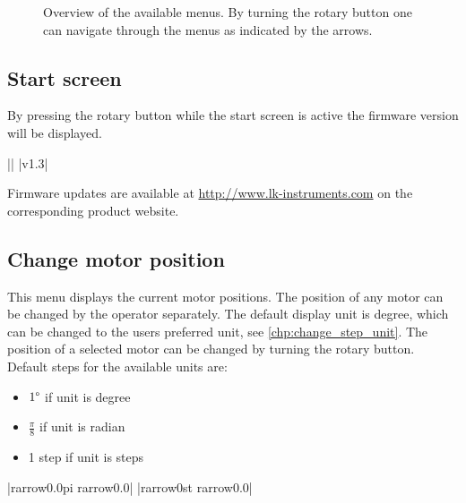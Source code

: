 \begin{figure}[H]
\caption[Overview of the available menus.]{Overview of the available menus. By turning
the rotary button one can navigate through the menus as indicated by the arrows.}
\label{main_menu}
\end{figure}

\FloatBarrier



\subsection{Start screen}
By pressing the rotary button while the start screen is active the
firmware version will be displayed.
\begin{center}
  ||
             |v1.3|
\end{center}
Firmware updates are available at \url{http://www.lk-instruments.com} on
the corresponding product website.

\subsection{Change motor position}
\label{menu_motor_pos}
This menu displays the current motor positions. The position of any motor can be
changed by the operator separately. The default display unit is degree, which
can be changed to the users preferred unit, see \ref{chp:change_step_unit}. The
position of a selected motor can be changed by turning the rotary
button. Default steps for the available units are:
\begin{itemize}
\item $1\degree$ if unit is degree
\item $\frac{\pi}{8}$ if unit is radian
\item 1 step if unit is steps
\end{itemize}
\begin{center}
  |{rarrow}0.0{pi}   {rarrow}0.0|
             |{rarrow}0st    {rarrow}0.0|
\end{center}


